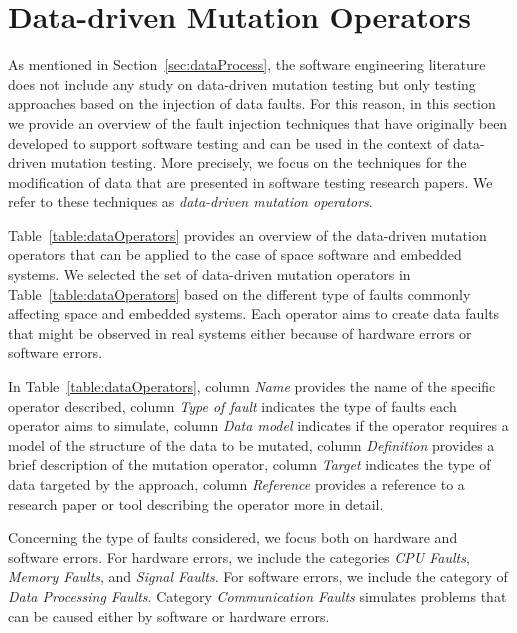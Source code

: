 
\section{Data-driven Mutation Operators}
\label{sec:data_operators}

As mentioned in Section~\ref{sec:dataProcess}, the software engineering literature does not include any study on data-driven mutation testing but only testing approaches based on the injection of data faults.
For this reason, 
in this section we provide an overview of the fault injection techniques that have originally been developed to support software testing and can be used in the context of data-driven mutation testing. 
More precisely, we focus on the techniques for the modification of data that are presented in software testing research papers.
We refer to these techniques as \emph{data-driven mutation operators}.

Table~\ref{table:dataOperators} provides an overview of the data-driven mutation operators that can be applied to the case of space software and embedded systems. 
We selected the set of data-driven mutation operators in Table~\ref{table:dataOperators} based on the different type of faults commonly affecting space and embedded systems. 
Each operator aims to create data faults that might be observed in real systems either because of hardware errors or software errors.

In Table~\ref{table:dataOperators}, column \emph{Name} provides the name of the specific operator described,  
 column \emph{Type of fault} indicates the type of faults each operator aims to simulate,
 column \emph{Data model} indicates if the operator requires a model of the structure of the data to be mutated,
 column \emph{Definition} provides a brief description of the mutation operator, column \emph{Target} indicates the type of data targeted by the approach,
 column \emph{Reference} provides a reference to a research paper or tool describing the operator more in detail.
 
Concerning the type of faults considered, we focus both on hardware and software errors.
For hardware errors, we include the categories \emph{CPU Faults}, \emph{Memory Faults}, and \emph{Signal Faults}. 
For software errors, we include the category of \emph{Data Processing Faults}.
Category \emph{Communication Faults} simulates problems that can be caused either by software or hardware errors.

